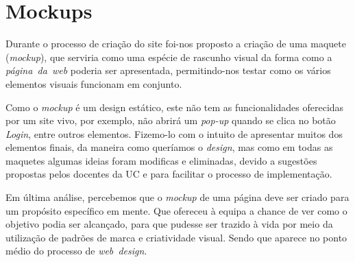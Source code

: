 \documentclass[11pt,a4paper]{report}
\begin{document}
\chapter{Mockups}

Durante o processo de criação do site foi-nos proposto a criação de uma maquete (\emph{mockup}), que serviria como uma espécie de rascunho visual da forma como a \emph{página\ da\ web} poderia ser apresentada, permitindo-nos testar como os vários elementos visuais funcionam em conjunto.

Como o \emph{mockup} é um design estático, este não tem as funcionalidades oferecidas por um site vivo, por exemplo, não abrirá um \emph{pop-up} quando se clica no botão \emph{Login}, entre outros elementos. Fizemo-lo com o intuito de apresentar muitos dos elementos finais, da maneira como queríamos o \emph{design}, mas como em todas as maquetes algumas ideias foram modificas e eliminadas, devido a sugestões propostas pelos docentes da UC e para facilitar o processo de implementação.

Em última análise, percebemos que o \emph{mockup} de uma página deve ser criado para um propósito específico em mente. Que ofereceu à equipa a chance de ver como o objetivo podia ser alcançado, para que pudesse ser trazido à vida por meio da utilização de padrões de marca e criatividade visual. Sendo que aparece no ponto médio do processo de \emph{web\ design}.
\end{document}
